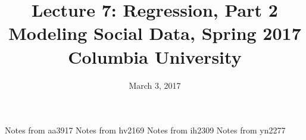 \documentclass{article}
\title{
Lecture 7: Regression, Part 2 \\  %
Modeling Social Data, Spring 2017 \\   %
Columbia University                    %
}
\date{March 3, 2017}                %
\makeatletter
\let\org@subfile
\renewcommand*{}[1]{%
  \filename@parse{#1}%
  \expandafter
  \graphicspath\expandafter{\expandafter{\filename@area}}%
  \org@subfile{#1}%
}
\makeatother
\begin{document}
\maketitle


\pagebreak \newpage \noindent\Huge{Notes from aa3917} \normalsize \setcounter{section}{0} 
\pagebreak \newpage \noindent\Huge{Notes from hv2169} \normalsize \setcounter{section}{0} 
\pagebreak \newpage \noindent\Huge{Notes from ih2309} \normalsize \setcounter{section}{0} 
\pagebreak \newpage \noindent\Huge{Notes from yn2277} \normalsize \setcounter{section}{0} 
\end{document}
